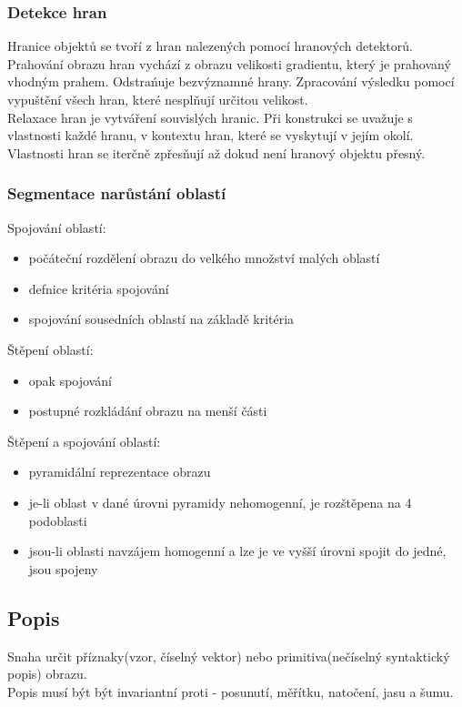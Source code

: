 \subsubsection{Detekce hran}
Hranice objektů se tvoří z hran nalezených pomocí hranových detektorů.\\
Prahování obrazu hran vychází z obrazu velikosti gradientu, který je prahovaný vhodným prahem. Odstrańuje bezvýznamné hrany. Zpracování výsledku pomocí vypuštění všech hran, které nesplňují určitou velikost.\\
Relaxace hran je vytváření souvislých hranic. Při konstrukci se uvažuje s vlastnosti každé hranu, v kontextu hran, které se vyskytují v jejím okolí. Vlastnosti hran se iterčně zpřesňují až dokud není hranový objektu přesný.\\

\subsubsection{Segmentace narůstání oblastí}
Spojování oblastí:
\begin{itemize}
    \item počáteční rozdělení obrazu do velkého množství malých oblastí
    \item defnice kritéria spojování
    \item spojování sousedních oblastí na základě kritéria
\end{itemize}
Štěpení oblastí:
\begin{itemize}
    \item opak spojování
    \item postupné rozkládání obrazu na menší části
\end{itemize}
Štěpení a spojování oblastí:
\begin{itemize}
    \item pyramidální reprezentace obrazu
    \item je-li oblast v dané úrovni pyramidy nehomogenní, je rozštěpena na 4 podoblasti
    \item jsou-li oblasti navzájem homogenní a lze je ve vyšší úrovni spojit do jedné, jsou spojeny
\end{itemize}

\subsection{Popis}
Snaha určit příznaky(vzor, číselný vektor) nebo primitiva(nečíselný syntaktický popis) obrazu.\\
Popis musí být být invariantní proti - posunutí, měřítku, natočení, jasu a šumu.\\
